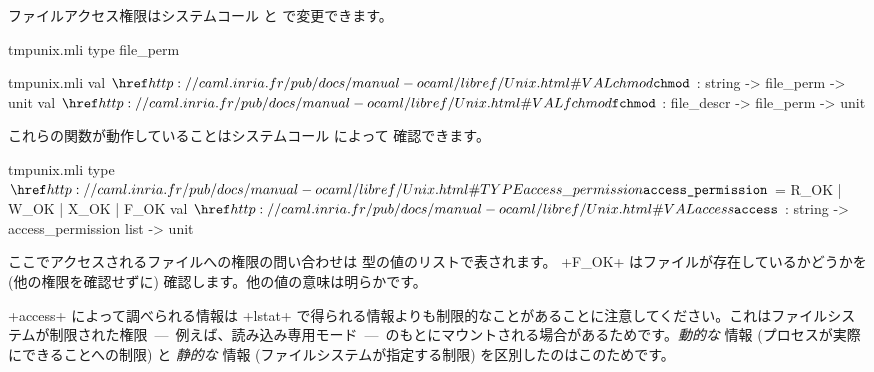 ファイルアクセス権限はシステムコール  と  で変更できます。
%
\begin{codefile}{tmpunix.mli}
type file_perm
\end{codefile}
%
\begin{listingcodefile}{tmpunix.mli}
val $\libvalue{Unix}{chmod}$ : string -> file_perm -> unit
val $\libvalue{Unix}{fchmod}$ : file_descr -> file_perm -> unit
\end{listingcodefile}
これらの関数が動作していることはシステムコール  によって  確認できます。
%
\begin{listingcodefile}{tmpunix.mli}
type $\libtype{Unix}{access\_permission}$ = R_OK | W_OK | X_OK | F_OK
val $\libvalue{Unix}{access}$ : string -> access_permission list -> unit
\end{listingcodefile}
%
ここでアクセスされるファイルへの権限の問い合わせは  型の値のリストで表されます。 \ml+F_OK+ はファイルが存在しているかどうかを (他の権限を確認せずに) 確認します。他の値の意味は明らかです。

\ml+access+ によって調べられる情報は \ml+lstat+ で得られる情報よりも制限的なことがあることに注意してください。これはファイルシステムが制限された権限~---~例えば、読み込み専用モード~---~のもとにマウントされる場合があるためです。\emph{動的な} 情報 (プロセスが実際にできることへの制限) と \emph{静的な} 情報 (ファイルシステムが指定する制限) を区別したのはこのためです。

